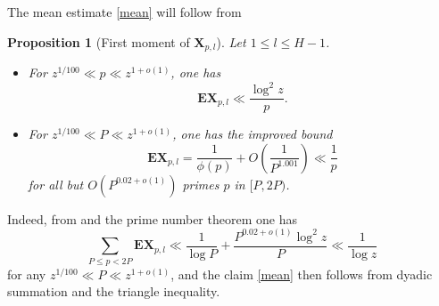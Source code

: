 \documentclass[12pt]{amsart}
\newtheorem{proposition}[theorem]{Proposition}
\newcommand{\E}{\mathbf{E}}
\begin{document}
The mean estimate \eqref{mean} will follow from

\begin{proposition}[First moment of $\mathbf{X}_{p,l}$]\label{prop-first} Let $1 \leq l \leq H-1$.
\begin{itemize}
    \item[(i)] For $z^{1/100} \ll p \ll z^{1+o(1)}$, one has
\begin{equation}\label{xpl-crude}
\E \mathbf{X}_{p,l} \ll \frac{\log^2 z}{p}.
\end{equation}
    \item[(ii)] For $z^{1/100} \ll P \ll z^{1+o(1)}$, one has the improved bound
\begin{equation}\label{zip-2}
    \E \mathbf{X}_{p,l} = \frac{1}{\phi(p)} + O\left(\frac{1}{P^{1.001}}\right) \ll \frac{1}{p}
\end{equation}
for all but $O(P^{0.02+o(1)})$ primes $p$ in $[P,2P)$.
\end{itemize}
\end{proposition}

Indeed, from  and the prime number theorem one has
$$ \sum_{P \leq p < 2P} \E \mathbf{X}_{p,l} \ll \frac{1}{\log P} + \frac{P^{0.02+o(1)} \log^2 z}{P} \ll \frac{1}{\log z}$$
for any $z^{1/100} \ll P \ll z^{1+o(1)}$, and the claim \eqref{mean} then follows from dyadic summation and the triangle inequality.
\end{document}
